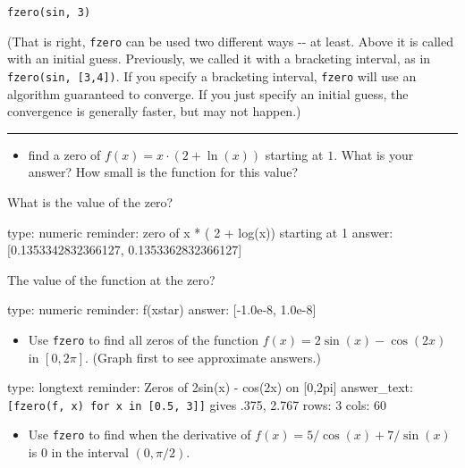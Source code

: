 \documentclass[12pt]{article}
\begin{document}
\begin{verbatim}
fzero(sin, 3)
\end{verbatim}
(That is right, \texttt{fzero} can be used two different ways -{}- at
least. Above it is called with an initial guess. Previously, we called
it with a bracketing interval, as in \texttt{fzero(sin, {[}3,4{]})}. If
you specify a bracketing interval, \texttt{fzero} will use an algorithm
guaranteed to converge. If you just specify an initial guess, the
convergence is generally faster, but may not happen.)

\begin{center}\rule{3in}{0.4pt}\end{center}

\begin{itemize}
\itemsep1pt\parskip0pt
\item
  find a zero of $f(x) = x\cdot (2+\ln(x))$ starting at $1$. What is
  your answer? How small is the function for this value?
\end{itemize}

What is the value of the zero?

\begin{answer}
    type: numeric
    reminder: zero of x * ( 2 + log(x)) starting at 1
    answer: [0.1353342832366127, 0.1353362832366127]

\end{answer}

The value of the function at the zero?

\begin{answer}
    type: numeric
    reminder: f(xstar)
    answer: [-1.0e-8, 1.0e-8]

\end{answer}

\begin{itemize}
\itemsep1pt\parskip0pt
\item
  Use \texttt{fzero} to find all zeros of the function
  $f(x) = 2\sin(x) -   \cos(2x)$ in $[0, 2\pi]$. (Graph first to see
  approximate answers.)
\end{itemize}

\begin{answer}
type: longtext
reminder: Zeros of 2sin(x) - cos(2x) on [0,2pi]
answer_text: \verb+[fzero(f, x) for x in [0.5, 3]]+ gives .375, 2.767 
rows: 3
cols: 60
\end{answer}

\begin{itemize}
\itemsep1pt\parskip0pt
\item
  Use \texttt{fzero} to find when the derivative of
  $f(x) = 5/\cos(x) +   7/\sin(x)$ is $0$ in the interval $(0, \pi/2)$.
\end{itemize}
\end{document}
